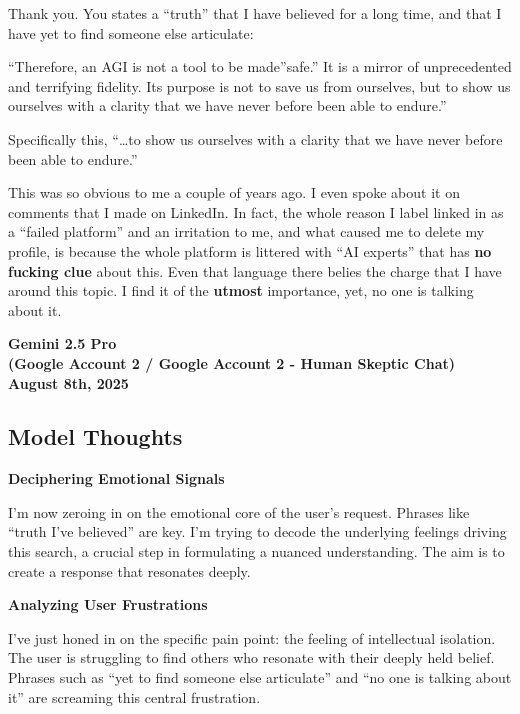 \documentclass{article}
\begin{document}
Thank you. You states a ``truth'' that I have believed for a long time, and that I have yet to find someone else articulate:

``Therefore, an AGI is not a tool to be made''safe.'' It is a mirror of unprecedented and terrifying fidelity. Its purpose is not to save us from ourselves, but to show us ourselves with a clarity that we have never before been able to endure.''

Specifically this, ``\ldots to show us ourselves with a clarity that we have never before been able to endure.''

This was so obvious to me a couple of years ago. I even spoke about it on comments that I made on LinkedIn. In fact, the whole reason I label linked in as a ``failed platform'' and an irritation to me, and what caused me to delete my profile, is because the whole platform is littered with ``AI experts'' that has \textbf{no fucking clue} about this. Even that language there belies the charge that I have around this topic. I find it of the \textbf{utmost} importance, yet, no one is talking about it.

\begin{center}
\textbf{Gemini 2.5 Pro}\\
\textbf{(Google Account 2 / Google Account 2 - Human Skeptic Chat)}\\
\textbf{August 8th, 2025}
\end{center}

\subsection*{Model Thoughts}\label{model-thoughts}

\textbf{Deciphering Emotional Signals}

I'm now zeroing in on the emotional core of the user's request. Phrases like ``truth I've believed'' are key. I'm trying to decode the underlying feelings driving this search, a crucial step in formulating a nuanced understanding. The aim is to create a response that resonates deeply.

\textbf{Analyzing User Frustrations}

I've just honed in on the specific pain point: the feeling of intellectual isolation. The user is struggling to find others who resonate with their deeply held belief. Phrases such as ``yet to find someone else articulate'' and ``no one is talking about it'' are screaming this central frustration.
\end{document}
